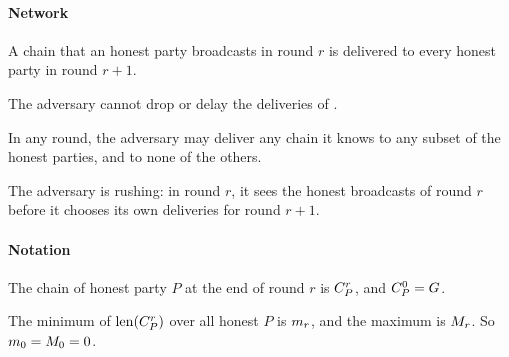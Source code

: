 \paragraph{Network}

\begin{assumption}\label{asm.honest-delivery}
A chain that an honest party broadcasts in round $r$ is delivered to every honest party in round $r + 1$.
\end{assumption}

\begin{assumption}\label{asm.no-drop}
The adversary cannot drop or delay the deliveries of .
\end{assumption}

\begin{assumption}\label{asm.adversarial-delivery}
In any round, the adversary may deliver any chain it knows to any subset of the honest parties, and to none of the others.
\end{assumption}

\begin{assumption}[Rushing]\label{asm.rushing}
The adversary is rushing: in round $r$, it sees the honest broadcasts of round $r$ before it chooses its own deliveries for round $r + 1$.
\end{assumption}

\paragraph{Notation}

\begin{definition}\label{def.chain-at}
The chain of honest party $P$ at the end of round $r$ is $C_{P}^{r}$, and $C_{P}^{0} = G$.
\end{definition}

\begin{definition}\label{def.min-max-len}
The minimum of $\operatorname{len}(C_{P}^{r})$ over all honest $P$ is $m_{r}$, and the maximum is $M_{r}$.
So $m_{0} = M_{0} = 0$.
\end{definition}
